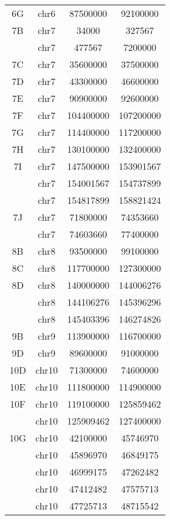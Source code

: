 \begin{center}
\begin{longtable}{@{\extracolsep{\fill}}cccc}
  6G     & chr6       & 87500000  & 92100000 \\
  7B     & chr7       & 34000     & 327567 \\
         & chr7       & 477567    & 7200000 \\
  7C     & chr7       & 35600000  & 37500000 \\
  7D     & chr7       & 43300000  & 46600000 \\
  7E     & chr7       & 90900000  & 92600000 \\
  7F     & chr7       & 104400000 & 107200000 \\
  7G     & chr7       & 114400000 & 117200000 \\
  7H     & chr7       & 130100000 & 132400000 \\
  7I     & chr7       & 147500000 & 153901567 \\
         & chr7       & 154001567 & 154737899 \\
         & chr7       & 154817899 & 158821424 \\
  7J     & chr7       & 71800000  & 74353660 \\
         & chr7       & 74603660  & 77400000 \\
  8B     & chr8       & 93500000  & 99100000 \\
  8C     & chr8       & 117700000 & 127300000 \\
  8D     & chr8       & 140000000 & 144006276 \\
         & chr8       & 144106276 & 145396296 \\
         & chr8       & 145403396 & 146274826 \\
  9B     & chr9       & 113900000 & 116700000 \\
  9D     & chr9       & 89600000  & 91000000 \\
  10D    & chr10      & 71300000  & 74600000 \\
  10E    & chr10      & 111800000 & 114900000 \\
  10F    & chr10      & 119100000 & 125859462 \\
         & chr10      & 125909462 & 127400000 \\
  10G    & chr10      & 42100000  & 45746970 \\
         & chr10      & 45896970  & 46849175 \\
         & chr10      & 46999175  & 47262482 \\
         & chr10      & 47412482  & 47575713 \\
         & chr10      & 47725713  & 48715542 \\

\end{longtable}
\end{center}
